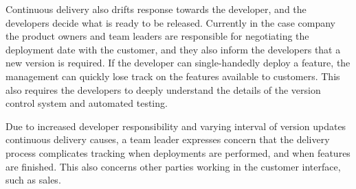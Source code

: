 \documentclass[lnbip]{svmultln}
\begin{document}

Continuous delivery also drifts response towards the developer, and the developers decide what is ready to be released. Currently in the case company the product owners and team leaders are responsible for negotiating the deployment date with the customer, and they also inform the developers that a new version is required. If the developer can single-handedly deploy a feature, the management can quickly lose track on the features available to customers. This also requires the developers to deeply understand the details of the version control system and automated testing. 

Due to increased developer responsibility and varying interval of version updates continuous delivery causes, a team leader expresses concern that the delivery process complicates tracking when deployments are performed, and when features are finished. This also concerns other parties working in the customer interface, such as sales. %



\end{document}
